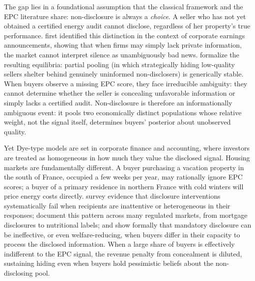 \documentclass[10pt,letterpaper]{bp-template-concise}
\begin{document}
The gap lies in a foundational assumption that the classical framework and the EPC literature share: non-disclosure is always a \emph{choice}. A seller who has not yet obtained a certified energy audit cannot disclose, regardless of her property's true performance. \citet{dye_disclosure_1985} first identified this distinction in the context of corporate earnings announcements, showing that when firms may simply lack private information, the market cannot interpret silence as unambiguously bad news. \citet{jung_kwon_1988} formalize the resulting equilibria: partial pooling (in which strategically hiding low-quality sellers shelter behind genuinely uninformed non-disclosers) is generically stable. When buyers observe a missing EPC score, they face irreducible ambiguity: they cannot determine whether the seller is concealing unfavorable information or simply lacks a certified audit. Non-disclosure is therefore an informationally ambiguous event: it pools two economically distinct populations whose relative weight, not the signal itself, determines buyers' posterior about unobserved quality.

Yet Dye-type models are set in corporate finance and accounting, where investors are treated as homogeneous in how much they value the disclosed signal. Housing markets are fundamentally different. A buyer purchasing a vacation property in the south of France, occupied a few weeks per year, may rationally ignore EPC scores; a buyer of a primary residence in northern France with cold winters will price energy costs directly. \citet{loewenstein_disclosure_2014} survey evidence that disclosure interventions systematically fail when recipients are inattentive or heterogeneous in their responses; \citet{benshahar_failure_2011} document this pattern across many regulated markets, from mortgage disclosures to nutritional labels; and \citet{fishman_mandatory_2003} show formally that mandatory disclosure can be ineffective, or even welfare-reducing, when buyers differ in their capacity to process the disclosed information. When a large share of buyers is effectively indifferent to the EPC signal, the revenue penalty from concealment is diluted, sustaining hiding even when buyers hold pessimistic beliefs about the non-disclosing pool.
\end{document}
